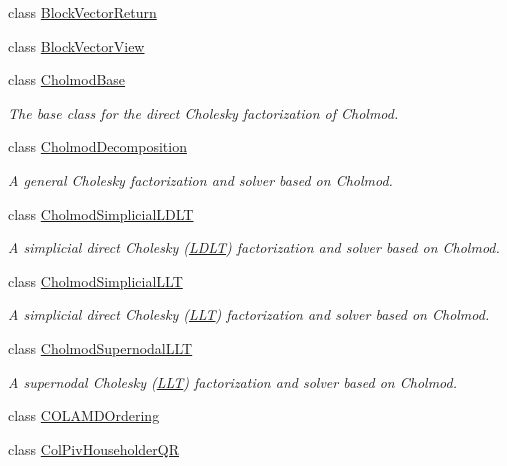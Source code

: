 \begin{DoxyCompactItemize}
\item 
class \hyperlink{class_eigen_1_1_block_vector_return}{Block\+Vector\+Return}
\item 
class \hyperlink{class_eigen_1_1_block_vector_view}{Block\+Vector\+View}
\item 
class \hyperlink{class_eigen_1_1_cholmod_base}{Cholmod\+Base}
\begin{DoxyCompactList}\small\item\em The base class for the direct Cholesky factorization of Cholmod. \end{DoxyCompactList}\item 
class \hyperlink{class_eigen_1_1_cholmod_decomposition}{Cholmod\+Decomposition}
\begin{DoxyCompactList}\small\item\em A general Cholesky factorization and solver based on Cholmod. \end{DoxyCompactList}\item 
class \hyperlink{class_eigen_1_1_cholmod_simplicial_l_d_l_t}{Cholmod\+Simplicial\+L\+D\+LT}
\begin{DoxyCompactList}\small\item\em A simplicial direct Cholesky (\hyperlink{group___cholesky___module_class_eigen_1_1_l_d_l_t}{L\+D\+LT}) factorization and solver based on Cholmod. \end{DoxyCompactList}\item 
class \hyperlink{class_eigen_1_1_cholmod_simplicial_l_l_t}{Cholmod\+Simplicial\+L\+LT}
\begin{DoxyCompactList}\small\item\em A simplicial direct Cholesky (\hyperlink{group___cholesky___module_class_eigen_1_1_l_l_t}{L\+LT}) factorization and solver based on Cholmod. \end{DoxyCompactList}\item 
class \hyperlink{class_eigen_1_1_cholmod_supernodal_l_l_t}{Cholmod\+Supernodal\+L\+LT}
\begin{DoxyCompactList}\small\item\em A supernodal Cholesky (\hyperlink{group___cholesky___module_class_eigen_1_1_l_l_t}{L\+LT}) factorization and solver based on Cholmod. \end{DoxyCompactList}\item 
class \hyperlink{group___ordering_methods___module_class_eigen_1_1_c_o_l_a_m_d_ordering}{C\+O\+L\+A\+M\+D\+Ordering}
\item 
class \hyperlink{group___q_r___module_class_eigen_1_1_col_piv_householder_q_r}{Col\+Piv\+Householder\+QR}

\end{DoxyCompactItemize}
